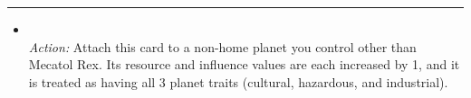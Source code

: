 \begin{multicols}{2}
\vspace{-10pt}\rule{\hsize}{0.4pt}\vspace{5pt}


\begin{itemize}
\item {}\\
\emph{Action:} Attach this card to a non-home planet you control other than Mecatol Rex. Its resource and influence values are each increased by 1, and it is treated as having all 3 planet traits (cultural, hazardous, and industrial).
\end{itemize}

\end{multicols}




